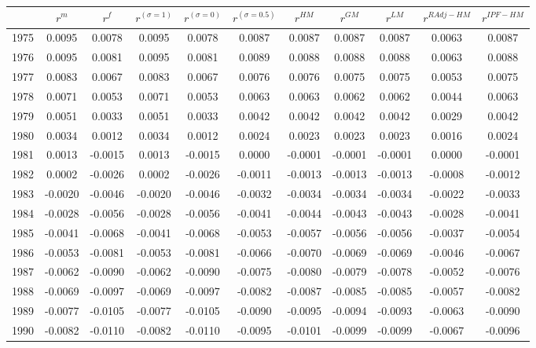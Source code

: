 \begin{tabular}{ccccccccccc}
  \hline
 & $r^m$ & $r^f$ & $r^{(\sigma = 1)}$ & $r^{(\sigma = 0)}$ & $r^{(\sigma = 0.5)}$ & $r^{HM}$ & $r^{GM}$ & $r^{LM}$ & $r^{RAdj-HM}$ & $r^{IPF-HM}$ \\ 
  \hline
1975 & 0.0095 & 0.0078 & 0.0095 & 0.0078 & 0.0087 & 0.0087 & 0.0087 & 0.0087 & 0.0063 & 0.0087 \\ 
  1976 & 0.0095 & 0.0081 & 0.0095 & 0.0081 & 0.0089 & 0.0088 & 0.0088 & 0.0088 & 0.0063 & 0.0088 \\ 
  1977 & 0.0083 & 0.0067 & 0.0083 & 0.0067 & 0.0076 & 0.0076 & 0.0075 & 0.0075 & 0.0053 & 0.0075 \\ 
  1978 & 0.0071 & 0.0053 & 0.0071 & 0.0053 & 0.0063 & 0.0063 & 0.0062 & 0.0062 & 0.0044 & 0.0063 \\ 
  1979 & 0.0051 & 0.0033 & 0.0051 & 0.0033 & 0.0042 & 0.0042 & 0.0042 & 0.0042 & 0.0029 & 0.0042 \\ 
  1980 & 0.0034 & 0.0012 & 0.0034 & 0.0012 & 0.0024 & 0.0023 & 0.0023 & 0.0023 & 0.0016 & 0.0024 \\ 
  1981 & 0.0013 & -0.0015 & 0.0013 & -0.0015 & 0.0000 & -0.0001 & -0.0001 & -0.0001 & 0.0000 & -0.0001 \\ 
  1982 & 0.0002 & -0.0026 & 0.0002 & -0.0026 & -0.0011 & -0.0013 & -0.0013 & -0.0013 & -0.0008 & -0.0012 \\ 
  1983 & -0.0020 & -0.0046 & -0.0020 & -0.0046 & -0.0032 & -0.0034 & -0.0034 & -0.0034 & -0.0022 & -0.0033 \\ 
  1984 & -0.0028 & -0.0056 & -0.0028 & -0.0056 & -0.0041 & -0.0044 & -0.0043 & -0.0043 & -0.0028 & -0.0041 \\ 
  1985 & -0.0041 & -0.0068 & -0.0041 & -0.0068 & -0.0053 & -0.0057 & -0.0056 & -0.0056 & -0.0037 & -0.0054 \\ 
  1986 & -0.0053 & -0.0081 & -0.0053 & -0.0081 & -0.0066 & -0.0070 & -0.0069 & -0.0069 & -0.0046 & -0.0067 \\ 
  1987 & -0.0062 & -0.0090 & -0.0062 & -0.0090 & -0.0075 & -0.0080 & -0.0079 & -0.0078 & -0.0052 & -0.0076 \\ 
  1988 & -0.0069 & -0.0097 & -0.0069 & -0.0097 & -0.0082 & -0.0087 & -0.0085 & -0.0085 & -0.0057 & -0.0082 \\ 
  1989 & -0.0077 & -0.0105 & -0.0077 & -0.0105 & -0.0090 & -0.0095 & -0.0094 & -0.0093 & -0.0063 & -0.0090 \\ 
  1990 & -0.0082 & -0.0110 & -0.0082 & -0.0110 & -0.0095 & -0.0101 & -0.0099 & -0.0099 & -0.0067 & -0.0096 \\ 

\end{tabular}

